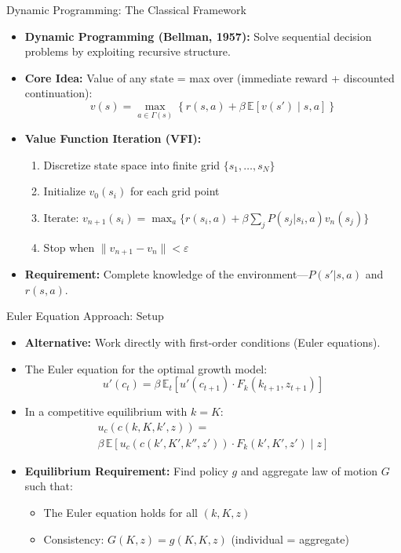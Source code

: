 \documentclass[10pt,english,aspectratio=169]{beamer}
\begin{document}
\begin{frame}{Dynamic Programming: The Classical Framework}
\begin{itemize}
\item \textbf{Dynamic Programming (Bellman, 1957):} Solve sequential decision problems by exploiting recursive structure.

\medskip
\item \textbf{Core Idea:} Value of any state = max over (immediate reward + discounted continuation):
\[
v(s) = \max_{a \in \Gamma(s)} \left\{ r(s, a) + \beta \, \mathbb{E}\left[ v(s') \mid s, a \right] \right\}
\]

\medskip
\item \textbf{Value Function Iteration (VFI):}
\begin{enumerate}
    \item Discretize state space into finite grid $\{s_1, \ldots, s_N\}$
    \item Initialize $v_0(s_i)$ for each grid point
    \item Iterate: $v_{n+1}(s_i) = \max_{a} \{ r(s_i, a) + \beta \sum_j P(s_j|s_i,a) v_n(s_j) \}$
    \item Stop when $\|v_{n+1} - v_n\| < \varepsilon$
\end{enumerate}

\medskip
\item \textbf{Requirement:} Complete knowledge of the environment---$P(s'|s,a)$ and $r(s,a)$.
\end{itemize}
\end{frame}

\begin{frame}{Euler Equation Approach: Setup}
\begin{itemize}
\item \textbf{Alternative:} Work directly with first-order conditions (Euler equations).

\medskip
\item The Euler equation for the optimal growth model:
\[
u'(c_t) = \beta \, \mathbb{E}_t \left[ u'(c_{t+1}) \cdot F_k(k_{t+1}, z_{t+1}) \right]
\]

\medskip
\item In a competitive equilibrium with $k = K$:
\begin{multline*}
u_c(c(k,K,k',z)) = \\
\beta \, \mathbb{E} \left[ u_c(c(k',K',k'',z')) \cdot F_k(k',K',z') \mid z \right]
\end{multline*}

\medskip
\item \textbf{Equilibrium Requirement:} Find policy $g$ and aggregate law of motion $G$ such that:
\begin{itemize}
    \item The Euler equation holds for all $(k, K, z)$
    \item Consistency: $G(K, z) = g(K, K, z)$ (individual = aggregate)
\end{itemize}
\end{itemize}
\end{frame}
\end{document}
